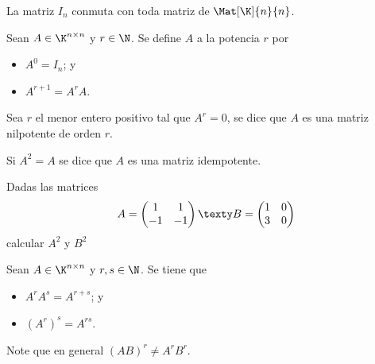 \documentclass[compacto,10pt]{pubciencias-notas}
\begin{document}
\begin{obs}
La matriz $I_{n}$ conmuta con toda matriz de $\Mat[\K]{n}{n}$.
\end{obs}

\begin{defi}
    Sean $A \in \K^{n \times n}$ y $r\in\N$. Se define $A$ a la potencia $r$ por
    \begin{itemize}
    \item[$a)$] 
        $A^0 = I_n$; y
    \item[$b)$] 
        $A^{r+1} = A^rA$.
    \end{itemize}
\end{defi}
\begin{obs}
    Sea $r$ el menor entero positivo tal que $A^r=0$, se dice que $A$ es una matriz nilpotente de orden $r$. 
\end{obs}
\begin{obs}
    Si $A^2=A$ se dice que $A$ es una  matriz idempotente. 
\end{obs}

\begin{ejer}
    Dadas las matrices
    \[
        A=\begin{pmatrix}1&1\\-1&-1\end{pmatrix}  \texty  B=\begin{pmatrix}1&0\\3&0\end{pmatrix}
    \]
    calcular $A^2$ y $B^2$
\end{ejer}

\begin{teo}\label{Apunte01TeoPot}
    Sean $A \in \K^{n \times n}$ y $r,s\in\N$. Se tiene que
    \begin{itemize}
    \item[$a)$] 
        $A^r A^s = A^{r+s}$; y 
    \item[$b)$] 
        $(A^r)^s = A^{rs}$.
    \end{itemize}
\end{teo}

\begin{advertencia}
Note que en general $(AB)^r \neq A^r B^r$.
\end{advertencia}
\end{document}
